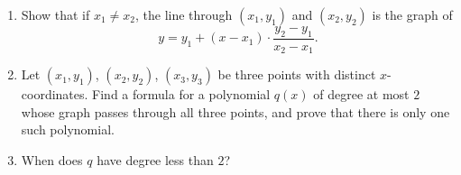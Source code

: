 \begin{enumerate}
\item[(a)] Show that if $x_1\ne x_2$, the line through $(x_1,y_1)$ and $(x_2,y_2)$ is the graph of
\[y=y_1+(x-x_1)\cdot\dfrac{y_2-y_1}{x_2-x_1}.\]
\item[(b)] Let $(x_1,y_1)$, $(x_2,y_2)$, $(x_3,y_3)$ be three points with distinct $x$-coordinates. Find a formula for a polynomial $q(x)$ of degree at most $2$ whose graph passes through all three points, and prove that there is only one such polynomial.
\item[(c)] When does $q$ have degree less than $2$?
\end{enumerate}
